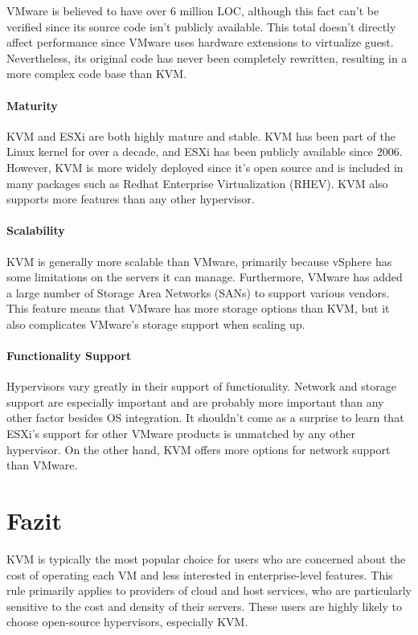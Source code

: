 \documentclass[14pt]{extreport}
\begin{document}
VMware is believed to have over 6 million LOC, although this fact can’t be verified since its source code isn’t publicly available. This total doesn’t directly affect performance since VMware uses hardware extensions to virtualize guest. Nevertheless, its original code has never been completely rewritten, resulting in a more complex code base than KVM.
\subsubsection{Maturity}

KVM and ESXi are both highly mature and stable. KVM has been part of the Linux kernel for over a decade, and ESXi has been publicly available since 2006. However, KVM is more widely deployed since it’s open source and is included in many packages such as Redhat Enterprise Virtualization (RHEV). KVM also supports more features than any other hypervisor.
\subsubsection{Scalability}

KVM is generally more scalable than VMware, primarily because vSphere has some limitations on the servers it can manage. Furthermore, VMware has added a large number of Storage Area Networks (SANs) to support various vendors. This feature means that VMware has more storage options than KVM, but it also complicates VMware’s storage support when scaling up.
\subsubsection{Functionality Support}

Hypervisors vary greatly in their support of functionality. Network and storage support are especially important and are probably more important than any other factor besides OS integration. It shouldn’t come as a surprise to learn that ESXi’s support for other VMware products is unmatched by any other hypervisor. On the other hand, KVM offers more options for network support than VMware.

\chapter{Fazit}
KVM is typically the most popular choice for users who are concerned about the cost of operating each VM and less interested in enterprise-level features. This rule primarily applies to providers of cloud and host services, who are particularly sensitive to the cost and density of their servers. These users are highly likely to choose open-source hypervisors, especially KVM.
\end{document}

